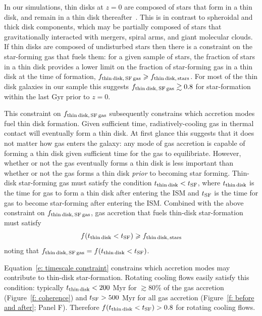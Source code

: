 \documentclass[fleqn,usenatbib]{mnras}
\begin{document}
In our simulations, thin disks at $z=0$ are composed of stars that form in a thin disk, and remain in a thin disk thereafter~\citep{Yu2021}.
This is in contrast to spheroidal and thick disk components, which may be partially composed of stars that gravitationally interacted with mergers, spiral arms, and giant molecular clouds.
If thin disks are composed of undisturbed stars then there is a  constraint on the star-forming gas that fuels them:
for a given sample of stars, the fraction of stars in a thin disk provides a lower limit on the fraction of star-forming gas in a thin disk at the time of formation, $f_{\rm thin\,disk,\,SF\,gas} \ge f_{\rm thin\,disk,\,stars}$.
For most of the thin disk galaxies in our sample this suggests $f_{\rm thin\,disk,\,SF\,gas} \gtrsim 0.8$ for star-formation within the last Gyr prior to $z=0$.

This constraint on $f_{\rm thin\,disk,\,SF\,gas}$ subsequently constrains which accretion modes fuel thin disk formation.
Given sufficient time, radiatively-cooling gas in thermal contact will eventually form a thin disk.
At first glance this suggests that it does not matter how gas enters the galaxy:
any mode of gas accretion is capable of forming a thin disk given sufficient time for the gas to equilibriate.
However, whether or not the gas eventually forms a thin disk is less important than whether or not the gas forms a thin disk \textit{prior} to becoming star forming.
Thin-disk star-forming gas must satisfy the condition $t_{\rm thin\,disk} < t_{\rm SF}$, where $t_{\rm thin\,disk}$ is the time for gas to form a thin disk after entering the ISM and $t_{\rm SF}$ is the time for gas to become star-forming after entering the ISM.
Combined with the above constraint on $f_{\rm thin\,disk,\,SF\,gas}$, gas accretion that fuels thin-disk star-formation must satisfy
\begin{equation}
    f( t_{\rm thin\,disk} < t_{\rm SF} ) \ge f_{\rm thin\,disk,\,stars}
    \label{e: timescale constraint}
\end{equation}
noting that $f_{\rm thin\,disk,\,SF\,gas} = f( t_{\rm thin\,disk} < t_{\rm SF} )$.

Equation~\ref{e: timescale constraint} constrains which accretion modes may contribute to thin-disk star-formation.
Rotating cooling flows easily satisfy this condition:
typically $t_{\rm thin\,disk} < 200$ Myr for $\gtrsim 80\%$ of the gas accretion (Figure~\ref{f: coherence}) and $t_{\rm SF} > 500$ Myr for all gas accretion (Figure~\ref{f: before and after}; Panel F).
Therefore $f( t_{\rm thin\,disk} < t_{\rm SF} ) > 0.8$ for rotating cooling flows.
\end{document}
